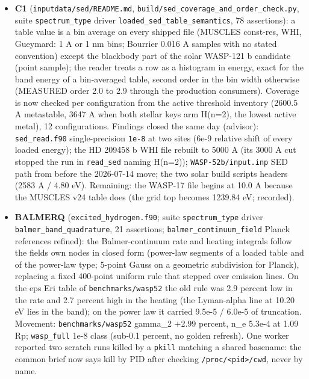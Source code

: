 \documentclass[english,a4paper]{my_memo}
\begin{document}
\begin{itemize}
\item
  \textbf{C1} (\texttt{inputdata/sed/README.md}, \texttt{build/sed\_coverage\_and\_order\_check.py},
  suite \texttt{spectrum\_type} driver \texttt{loaded\_sed\_table\_semantics}, 78 assertions):
  a table value is a bin average on every shipped file (MUSCLES const-res,
  WHI, Gueymard: 1 A or 1 nm bins; Bourrier 0.016 A samples with no stated
  convention) except the blackbody part of the solar WASP-121 b candidate
  (point sample); the reader treats a row as a histogram in energy, exact
  for the band energy of a bin-averaged table, second order in the bin
  width otherwise (MEASURED order 2.0 to 2.9 through the production
  consumers). Coverage is now checked per configuration from the active
  threshold inventory (2600.5 A metastable, 3647 A when both stellar keys
  arm H(n=2), the lowest active metal), 12 configurations. Findings closed
  the same day (advisor): \texttt{sed\_read.f90} single-precision \texttt{1e-8} at two
  sites (6e-9 relative shift of every loaded energy); the HD 209458 b WHI
  file rebuilt to 5000 A (its 3000 A cut stopped the run in \texttt{read\_sed}
  naming H(n=2)); \texttt{WASP-52b/input.inp} SED path from before the 2026-07-14
  move; the two solar build scripts\textquotesingle{} headers (2583 A / 4.80 eV). Remaining:
  the WASP-17 file begins at 10.0 A because the MUSCLES v24 table does (the
  grid top becomes 1239.84 eV; recorded).
\item
  \textbf{BALMERQ} (\texttt{excited\_hydrogen.f90}; suite \texttt{spectrum\_type} driver
  \texttt{balmer\_band\_quadrature}, 21 assertions; \texttt{balmer\_continuum\_field} Planck
  references refined): the Balmer-continuum rate and heating integrals
  follow the field\textquotesingle s own nodes in closed form (power-law segments of a
  loaded table and of the power-law type; 5-point Gauss on a geometric
  subdivision for Planck), replacing a fixed 400-point uniform rule that
  stepped over emission lines. On the eps Eri table of \texttt{benchmarks/wasp52}
  the old rule was 2.9 percent low in the rate and 2.7 percent high in the
  heating (the Lyman-alpha line at 10.20 eV lies in the band); on the power
  law it carried 9.5e-5 / 6.0e-5 of truncation. Movement: \texttt{benchmarks/wasp52}
  gamma\_2 +2.99 percent, n\_e 5.3e-4 at 1.09 Rp; \texttt{wasp\_full} 1e-8 class
  (sub-0.1 percent, no golden refresh). One worker reported two scratch runs
  killed by a \texttt{pkill} matching a shared basename: the common brief now says
  kill by PID after checking \texttt{/proc/\textless{}pid\textgreater{}/cwd}, never by name.

\end{itemize}
\end{document}
